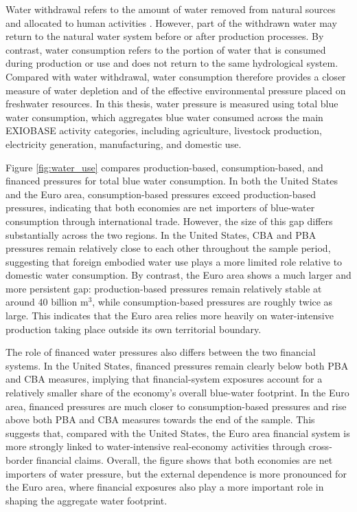 Water withdrawal refers to the amount of water removed from natural sources and allocated to human activities \citep{gleick_water_2003, rijsberman_water_2006}. However, part of the withdrawn water may return to the natural water system before or after production processes. By contrast, water consumption refers to the portion of water that is consumed during production or use and does not return to the same hydrological system. Compared with water withdrawal, water consumption therefore provides a closer measure of water depletion and of the effective environmental pressure placed on freshwater resources. In this thesis, water pressure is measured using total blue water consumption, which aggregates blue water consumed across the main EXIOBASE activity categories, including agriculture, livestock production, electricity generation, manufacturing, and domestic use.

Figure \ref{fig:water_use} compares production-based, consumption-based, and financed pressures for total blue water consumption. In both the United States and the Euro area, consumption-based pressures exceed production-based pressures, indicating that both economies are net importers of blue-water consumption through international trade. However, the size of this gap differs substantially across the two regions. In the United States, CBA and PBA pressures remain relatively close to each other throughout the sample period, suggesting that foreign embodied water use plays a more limited role relative to domestic water consumption. By contrast, the Euro area shows a much larger and more persistent gap: production-based pressures remain relatively stable at around 40 billion m$^3$, while consumption-based pressures are roughly twice as large. This indicates that the Euro area relies more heavily on water-intensive production taking place outside its own territorial boundary.

The role of financed water pressures also differs between the two financial systems. In the United States, financed pressures remain clearly below both PBA and CBA measures, implying that financial-system exposures account for a relatively smaller share of the economy's overall blue-water footprint. In the Euro area, financed pressures are much closer to consumption-based pressures and rise above both PBA and CBA measures towards the end of the sample. This suggests that, compared with the United States, the Euro area financial system is more strongly linked to water-intensive real-economy activities through cross-border financial claims. Overall, the figure shows that both economies are net importers of water pressure, but the external dependence is more pronounced for the Euro area, where financial exposures also play a more important role in shaping the aggregate water footprint.

